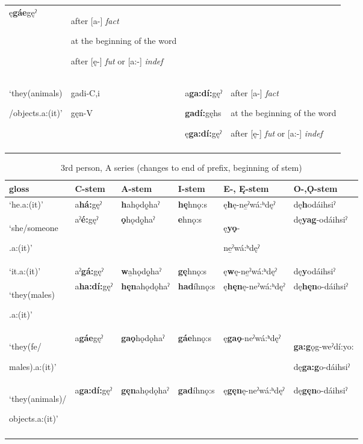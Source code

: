 \begin{table}
{\begin{tabularx}{\textwidth}{XXXX}
ę\textbf{gáe}gęˀ & after [a-] \textit{fact}

at the beginning of the word 

after [ę-] \textit{fut} or [a:-] \textit{indef}\\
‘they(animals)

/objects.a:(it)’ & gadi-C,i

gęn-V & a\textbf{ga:dí:}gęˀ

\textbf{gadí:}gęhs

ę\textbf{ga:dí:}gęˀ & after [a-] \textit{fact}

at the beginning of the word 

after [ę-] \textit{fut} or [a:-] \textit{indef}\\
\lspbottomrule
\end{tabularx}}
\end{table}


\lipsum[1-1]

\begin{table}
\caption{3rd person, A series (changes to end of prefix, beginning of stem)}
\label{tab:1:3apron2}
\tiny{
\begin{tabularx}{\textwidth}{XXXXXX}
\lsptoprule
gloss & C-stem & A-stem & I-stem & E-, Ę{}-stem & O-,Ǫ{}-stem\\
\midrule
‘he.a:(it)’ & a\textbf{há:}gęˀ & \textbf{h}ahǫdǫ̱haˀ & \textbf{hę}hnǫ:s & ę\textbf{h}ę-ne̱ˀwá:ʰdęˀ & dę\textbf{h}odáihsiˀ\\
‘she/someone

.a:(it)’ & aˀ\textbf{é:}gęˀ & \textbf{ǫ}hǫdǫ̱haˀ & \textbf{e}hnǫ:s & ę\textbf{yǫ}-

ne̱ˀwá:ʰdęˀ & dę\textbf{yag}-odáihsiˀ\\
‘it.a:(it)’ & aˀ\textbf{gá:}gęˀ & \textbf{w}a̱hǫdǫ̱haˀ & \textbf{gę}hnǫ:s & ę\textbf{w}ę-ne̱ˀwá:ʰdęˀ & dę\textbf{y}odáihsiˀ\\
‘they(males)

.a:(it)’ & a\textbf{ha:dí:}gęˀ & \textbf{hęn}ahǫdǫhaˀ & \textbf{had}íhnǫ:s & ę\textbf{hęn}ę-neˀwá:ʰdęˀ & dę\textbf{hęn}o-dáihsiˀ\\
‘they(fe/

males).a:(it)’ & a\textbf{gáe}gęˀ & \textbf{gaǫ}hǫdǫhaˀ & \textbf{gáe}hnǫ:s & ę\textbf{gaǫ}-neˀwá:ʰdęˀ & \textbf{ga:g}ǫg-weˀdí:yo:

dę\textbf{ga:g}o-dáihsiˀ\\
‘they(animals)/

objects.a:(it)’ & a\textbf{ga:dí:}gęˀ & \textbf{gęn}ahǫdǫhaˀ & \textbf{gad}íhnǫ:s & ę\textbf{gęn}ę-neˀwá:ʰdęˀ & dę\textbf{gęn}o-dáihsiˀ\\
\lspbottomrule
\end{tabularx}}
\end{table}


